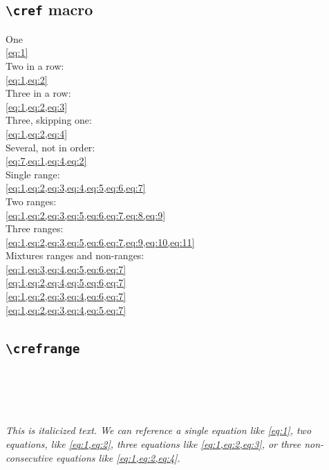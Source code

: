 \documentclass{article}
\begin{document}
  \subsection*{{\normalfont\texttt{\textbackslash{}cref}} macro}
  One\\
  \cref{eq:1}\\
  Two in a row:\\
  \cref{eq:1,eq:2}\\
  Three in a row:\\
  \cref{eq:1,eq:2,eq:3}\\
  Three, skipping one:\\
  \cref{eq:1,eq:2,eq:4}\\
  Several, not in order:\\
  \cref{eq:7,eq:1,eq:4,eq:2}\\
  Single range:\\
  \cref{eq:1,eq:2,eq:3,eq:4,eq:5,eq:6,eq:7}\\
  Two ranges:\\
  \cref{eq:1,eq:2,eq:3,eq:5,eq:6,eq:7,eq:8,eq:9}\\
  Three ranges: \\
  \cref{eq:1,eq:2,eq:3,eq:5,eq:6,eq:7,eq:9,eq:10,eq:11}\\
  Mixtures ranges and non-ranges:\\
  \cref{eq:1,eq:3,eq:4,eq:5,eq:6,eq:7}\\
  \cref{eq:1,eq:2,eq:4,eq:5,eq:6,eq:7}\\
  \cref{eq:1,eq:2,eq:3,eq:4,eq:6,eq:7}\\
  \cref{eq:1,eq:2,eq:3,eq:4,eq:5,eq:7}\\
  
  
  \subsection*{{\normalfont\texttt{\textbackslash{}crefrange}}}
  \\
  \\
  \\
  \\

  {
    \itshape
    This is italicized text. We can reference a single equation like \cref{eq:1}, two equations, like \cref{eq:1,eq:2}, three equations like \cref{eq:1,eq:2,eq:3}, or three non-consecutive equations like \cref{eq:1,eq:2,eq:4}.
  }
\end{document}

